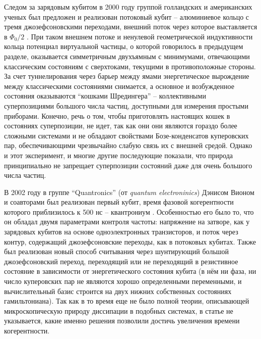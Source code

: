 \documentclass[14pt, a4paper]{extreport}
\numberwithin{equation}{section}
\begin{document}
Следом за зарядовым кубитом в 2000 году группой голландских и американских ученых был предложен и реализован потоковый кубит -- алюминиевое кольцо с тремя джозефсоновскими переходами, внешний поток через которое выставляется в $ \Phi_0/2 $ \cite{van2000quantum}. При таком внешнем потоке и ненулевой геометрической индуктивности кольца потенциал виртуальной частицы, о которой говорилось в предыдущем разделе, оказывается симметричным двухъямным с минимумами, отвечающими классическим состояниям с сверхтоками, текущими в противоположные стороны. За счет туннелирования через барьер между ямами энергетическое вырождение между классическими состояниями снимается, а основное и возбужденное состояния оказываются  ``кошками Шредингера'' -- коллективными суперпозициями большого числа частиц, доступными для измерения простыми приборами. Конечно, речь о том, чтобы приготовлять настоящих кошек в состояниях суперпозиции, не идет, так как они они являются гораздо более сложными системами и не обладают свойствами Бозе-конденсатов куперовских пар, обеспечивающими чрезвычайно слабую связь их с внешней средой. Однако и этот эксперимент, и многие другие последующие показали, что природа принципиально не запрещает суперпозиции состояний даже для очень большого числа частиц.



В 2002 году в группе ``Quantronics'' (от \textit{quantum electroninics}) Дэнисом Вионом и соавторами был реализован первый кубит, время фазовой когерентности которого приблизилось к 500 нс -- квантрониум \cite{vion2002manipulating}. Особенностью его было то, что он обладал двумя параметрами контроля частоты: напряжение на затворе, как у зарядовых кубитов на основе одноэлектронных транзисторов, и поток через контур, содержащий джозефсоновские переходы, как в потоковых кубитах. Также был реализован новый способ считывания через шунтирующий большой джозефсоновский переход, переходящий или не переходящий в резистивное состояние в зависимости от энергетического состояния кубита (в нём ни фаза, ни число куперовских пар не являются хорошо определенными переменными, и вычислительный базис строится на двух нижних собственных состояниях гамильтониана). Так как в то время еще не было полной теории, описывающей микроскопическую природу диссипации в подобных системах, в статье не указывается, какие именно решения позволили достичь увеличения времени когерентности. 
\end{document}
